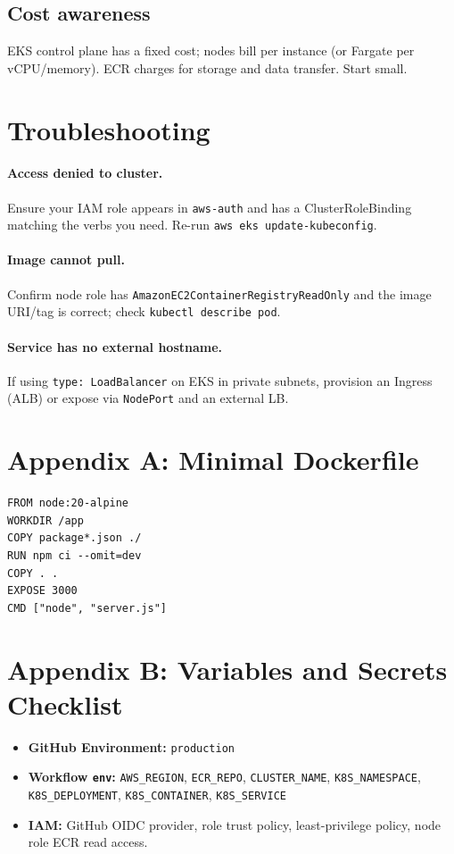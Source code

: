 \documentclass[11pt]{article}
\begin{document}
\subsection{Cost awareness}
EKS control plane has a fixed cost; nodes bill per instance (or Fargate per vCPU/memory). ECR charges for storage and data transfer. Start small.

\section{Troubleshooting}
\paragraph{Access denied to cluster.} Ensure your IAM role appears in \texttt{aws-auth} and has a ClusterRoleBinding matching the verbs you need. Re-run \texttt{aws eks update-kubeconfig}.

\paragraph{Image cannot pull.} Confirm node role has \texttt{AmazonEC2ContainerRegistryReadOnly} and the image URI/tag is correct; check \texttt{kubectl describe pod}.

\paragraph{Service has no external hostname.} If using \texttt{type: LoadBalancer} on EKS in private subnets, provision an Ingress (ALB) or expose via \texttt{NodePort} and an external LB.
\clearpage

\section{Appendix A: Minimal Dockerfile}
\begin{verbatim}
FROM node:20-alpine
WORKDIR /app
COPY package*.json ./
RUN npm ci --omit=dev
COPY . .
EXPOSE 3000
CMD ["node", "server.js"]
\end{verbatim}

\section{Appendix B: Variables and Secrets Checklist}
\begin{itemize}
  \item \textbf{GitHub Environment:} \texttt{production}
  \item \textbf{Workflow \texttt{env}:} \texttt{AWS\_REGION}, \texttt{ECR\_REPO}, \texttt{CLUSTER\_NAME}, \texttt{K8S\_NAMESPACE}, \texttt{K8S\_DEPLOYMENT}, \texttt{K8S\_CONTAINER}, \texttt{K8S\_SERVICE}
  \item \textbf{IAM:} GitHub OIDC provider, role trust policy, least-privilege policy, node role ECR read access.
\end{itemize}
\end{document}
